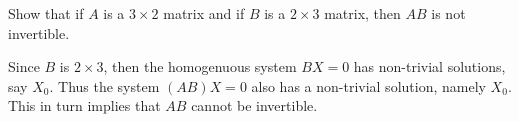 
\begin{Exercise}[
name={},
title={}, 
difficulty=0,
origin={\cite{SS}}]
Show that if $A$ is a $3\times2$ matrix and if $B$ is a $2\times3$ matrix, then $AB$ is not invertible.
\end{Exercise}

\begin{Answer}
Since $B$ is $2\times3$, then the homogenuous system $BX=0$ has non-trivial solutions, say $X_0$. Thus the system $(AB)X=0$ also has a non-trivial solution, namely $X_0$. This in turn implies that $AB$ cannot be invertible.
\end{Answer}
